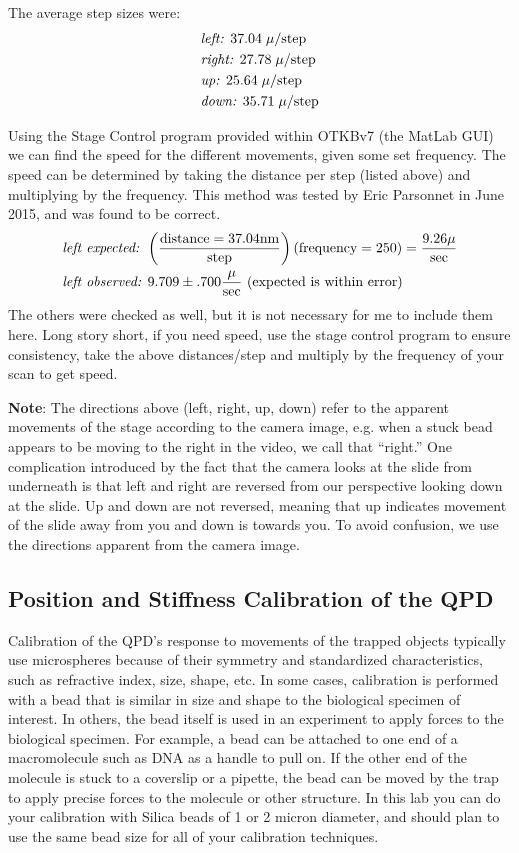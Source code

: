 \documentclass{../lab}
\begin{document}
The average step sizes were:
\begin{align*}
    &\emph{left: } 37.04 \;\mu/\text{step} \\
    &\emph{right: } 27.78 \;\mu/\text{step} \\
    &\emph{up: } 25.64 \;\mu/\text{step} \\
    &\emph{down: } 35.71 \;\mu/\text{step}
\end{align*}

\newpage

Using the Stage Control program provided within OTKBv7 (the MatLab GUI) we can find the speed for the different movements, given some set frequency. The speed can be determined by taking the distance per step (listed above) and multiplying by the frequency. This method was tested by Eric Parsonnet in June 2015, and was found to be correct.
\begin{align*}
    &\emph{left expected: } \left(\frac{\text{distance} = 37.04 \text{nm}}{\text{step}}\right)(\text{frequency} = 250)=\frac{9.26 \mu}{\text{sec}} \\
    &\emph{left observed: } 9.709 \pm .700 \frac{\mu}{\text{sec}} \text{ (expected is within error)}
\end{align*}
The others were checked as well, but it is not necessary for me to include them here. Long story short, if you need speed, use the stage control program to ensure consistency, take the above distances/step and multiply by the frequency of your scan to get speed.

\textbf{Note}: The directions above (left, right, up, down) refer to the apparent movements of the stage according to the camera image, e.g. when a stuck bead appears to be moving to the right in the video, we call that ``right.'' One complication introduced by the fact that the camera looks at the slide from underneath is that left and right are reversed from our perspective looking down at the slide. Up and down are not reversed, meaning that up indicates movement of the slide away from you and down is towards you. To avoid confusion, we use the directions apparent from the camera image.

\subsection{Position and Stiffness Calibration of the QPD}

Calibration of the QPD's response to movements of the trapped objects typically use microspheres because of their symmetry and standardized characteristics, such as refractive index, size, shape, etc. In some cases, calibration is performed with a bead that is similar in size and shape to the biological specimen of interest. In others, the bead itself is used in an experiment to apply forces to the biological specimen. For example, a bead can be attached to one end of a macromolecule such as DNA as a handle to pull on. If the other end of the molecule is stuck to a coverslip or a pipette, the bead can be moved by the trap to apply precise forces to the molecule or other structure. In this lab you can do your calibration with Silica beads of 1 or 2 micron diameter, and should plan to use the same bead size for all of your calibration techniques.
\end{document}
